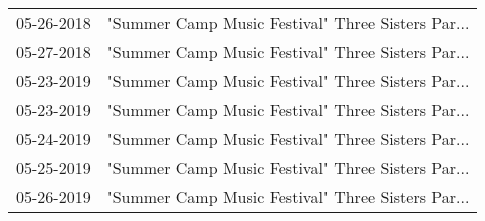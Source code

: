 \begin{supertabular}{ll}
 05-26-2018 &  "Summer Camp Music Festival" Three Sisters Par... \\
 05-27-2018 &  "Summer Camp Music Festival" Three Sisters Par... \\
 05-23-2019 &  "Summer Camp Music Festival" Three Sisters Par... \\
 05-23-2019 &  "Summer Camp Music Festival" Three Sisters Par... \\
 05-24-2019 &  "Summer Camp Music Festival" Three Sisters Par... \\
 05-25-2019 &  "Summer Camp Music Festival" Three Sisters Par... \\
 05-26-2019 &  "Summer Camp Music Festival" Three Sisters Par... \\
\end{supertabular}
